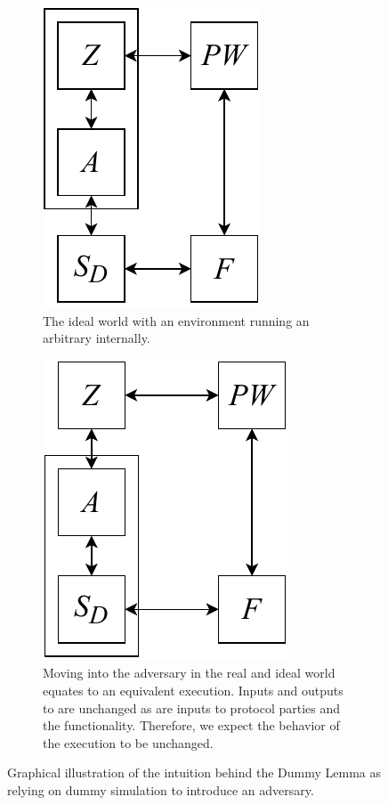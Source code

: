 \begin{figure}
	\begin{subfigure}[t]{0.45\textwidth}
	\centering
	\includegraphics[scale=0.5]{figures/dummylemma_pre.pdf}
	\caption{The ideal world with an environment running an arbitrary \A internally.}
	\label{fig:dummy_pre}
	\end{subfigure}
	\hspace{2mm}
	\begin{subfigure}[t]{0.45\textwidth}
	\centering
	\includegraphics[scale=0.5]{figures/dummylemma_post.pdf}
	\caption{Moving \A into the adversary in the real and ideal world equates to an equivalent execution. Inputs and outputs to \DS are unchanged as are inputs to protocol parties and the functionality. Therefore, we expect the behavior of the execution to be unchanged.}
	\label{fig:dummy_post}
	\end{subfigure}
	\caption{Graphical illustration of the intuition behind the Dummy Lemma as relying on dummy simulation to introduce an adversary.}
	\label{fig:dummylemmas}
\end{figure}


